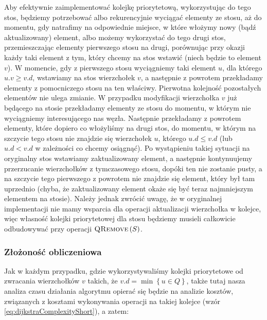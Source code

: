 Aby efektywnie zaimplementować kolejkę priorytetową, wykorzystując do tego stos, będziemy potrzebować albo rekurencyjnie wyciągać elementy ze stosu, aż do momentu, gdy natrafimy na odpowiednie miejsce, w które włożymy nowy (bądź aktualizowany) element, albo możemy wykorzystać do tego drugi stos, przemieszczając elementy pierwszego stosu na drugi, porównując przy okazji każdy taki element z tym, który chcemy na stos wstawić (niech będzie to element $v$). W momencie, gdy z pierwszego stosu wyciągniemy taki element $u$, dla którego $u.v \geqslant v.d$, wstawiamy na stos wierzchołek $v$, a następnie z powrotem przekładamy elementy z pomocniczego stosu na ten właściwy. Pierwotna kolejność pozostałych elementów nie ulega zmianie. W przypadku modyfikacji wierzchołka $v$ już będącego na stosie przekładamy elementy ze stosu do momentu, w którym nie wyciągniemy interesującego nas węzła. Następnie przekładamy z powrotem elementy, które dopiero co włożyliśmy na drugi stos, do momentu, w którym na szczycie tego stosu nie znajdzie się wierzchołek $u$, którego $u.d \leqslant v.d$ (lub $u.d < v.d$ w zależności co chcemy osiągnąć). Po wystąpieniu takiej sytuacji na oryginalny stos wstawiamy zaktualizowany element, a następnie kontynuujemy przerzucanie wierzchołków z tymczasowego stosu, dopóki ten nie zostanie pusty, a na szczycie tego pierwszego z powrotem nie znajdzie się element, który był tam uprzednio (chyba, że zaktualizowany element okaże się być teraz najmniejszym elementem na stosie). Należy jednak zwrócić uwagę, że w oryginalnej implementacji nie mamy wsparcia dla operacji aktualizacji wierzchołka w kolejce, więc własność kolejki priorytetowej dla stosu będziemy musieli całkowicie odbudowywać przy operacji $\textrm{\textsc{QRemove}} \left( S \right) $.

\subsubsection{Złożoność obliczeniowa}

Jak w każdym przypadku, gdzie wykorzystywaliśmy kolejki priorytetowe od zwracania wierzchołków $v$ takich, że $v.d = \min \left\{ u \in Q \right\}$, także tutaj nasza analiza czasu działania algorytmu opierać się będzie na analizie kosztów, związanych z kosztami wykonywania operacji na takiej kolejce (wzór \ref{eq:dijkstraComplexityShort}), a zatem:

